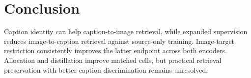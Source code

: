 \section{Conclusion}
Caption identity can help caption-to-image retrieval, while expanded supervision reduces image-to-caption retrieval against source-only training.
Image-target restriction consistently improves the latter endpoint across both encoders.
Allocation and distillation improve matched cells, but practical retrieval preservation with better caption discrimination remains unresolved.
